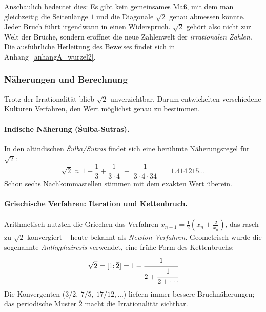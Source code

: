 Anschaulich bedeutet dies: 
Es gibt kein gemeinsames Maß, 
mit dem man gleichzeitig die Seitenlänge $1$ und die Diagonale $\sqrt{2}$ 
genau abmessen könnte. 
Jeder Bruch führt irgendwann in einen Widerspruch. 
$\sqrt{2}$ gehört also nicht zur Welt der Brüche, 
sondern eröffnet die neue Zahlenwelt der \emph{irrationalen Zahlen}.
Die ausführliche Herleitung des Beweises findet sich in 
Anhang~\ref{anhangA_wurzel2}.

\subsubsection*{Näherungen und Berechnung}
Trotz der Irrationalität blieb $\sqrt{2}$ unverzichtbar. 
Darum entwickelten verschiedene Kulturen Verfahren, den Wert möglichst genau zu bestimmen.

\paragraph{Indische Näherung (Śulba-Sūtras).}
In den altindischen \emph{Śulba\-/Sūtras}
findet sich eine berühmte Näherungsregel für $\sqrt{2}$:
\[
\sqrt{2}\approx 1+\frac{1}{3}+\frac{1}{3\cdot 4}\;-\;\frac{1}{3\cdot 4\cdot 34}
\;=\;1.414\,215\ldots
\]
Schon sechs Nachkommastellen stimmen mit dem exakten Wert überein.

\paragraph{Griechische Verfahren: Iteration und Kettenbruch.}
Arithmetisch nutzten die Griechen das Verfahren 
$x_{n+1}=\tfrac{1}{2}(x_n+\tfrac{2}{x_n})$, 
das rasch zu $\sqrt{2}$ konvergiert – 
heute bekannt als \emph{Newton-Verfahren}.  
Geometrisch wurde die sogenannte \emph{Anthyphairesis} verwendet, 
eine frühe Form des Kettenbruchs:
\[
\sqrt{2}=[1;\overline{2}]=1+\cfrac{1}{2+\cfrac{1}{2+\cdots}}
\]
Die Konvergenten ($3/2,\ 7/5,\ 17/12,\dots$) liefern immer bessere Bruchnäherungen; 
das periodische Muster $\overline{2}$ macht die Irrationalität sichtbar.



